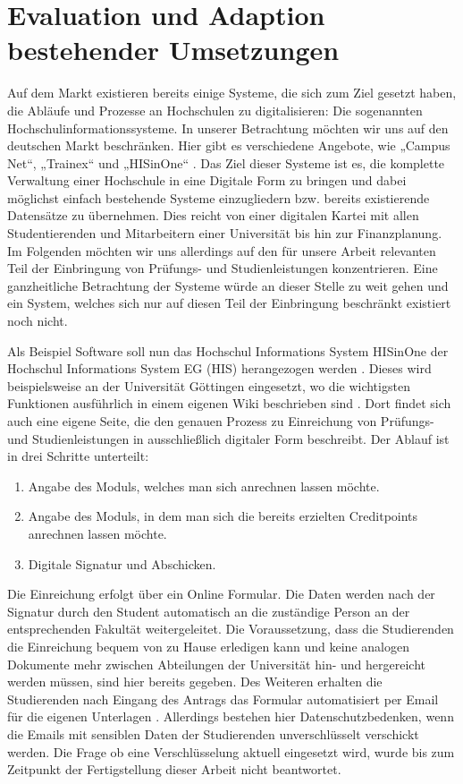 \section{Evaluation und Adaption bestehender Umsetzungen}

Auf dem Markt existieren bereits einige Systeme, die sich zum Ziel gesetzt haben, die Abläufe und Prozesse an Hochschulen zu digitalisieren: Die sogenannten Hochschulinformationssysteme. In unserer Betrachtung möchten wir uns auf den deutschen Markt beschränken. Hier gibt es verschiedene Angebote, wie „Campus Net“, „Trainex“ und „HISinOne“ \parencite{wiki_his}. Das Ziel dieser Systeme ist es, die komplette Verwaltung einer Hochschule in eine Digitale Form zu bringen und dabei möglichst einfach bestehende Systeme einzugliedern bzw. bereits existierende Datensätze zu übernehmen. Dies reicht von einer digitalen Kartei mit allen Studentierenden und Mitarbeitern einer Universität bis hin zur Finanzplanung. Im Folgenden möchten wir uns allerdings auf den für unsere Arbeit relevanten Teil der Einbringung von Prüfungs- und Studienleistungen konzentrieren. Eine ganzheitliche Betrachtung der Systeme würde an dieser Stelle zu weit gehen und ein System, welches sich nur auf diesen Teil der Einbringung beschränkt existiert noch nicht.

Als Beispiel Software soll nun das Hochschul Informations System HISinOne der Hochschul Informations System EG (HIS) herangezogen werden \parencite{hisde}. Dieses wird beispielsweise an der Universität Göttingen eingesetzt, wo die wichtigsten Funktionen ausführlich in einem eigenen Wiki beschrieben sind \parencite{studit}. Dort findet sich auch eine eigene Seite, die den genauen Prozess zu Einreichung von Prüfungs- und Studienleistungen in ausschließlich digitaler Form beschreibt. Der Ablauf ist in drei Schritte unterteilt:
\begin{enumerate}
\item Angabe des Moduls, welches man sich anrechnen lassen möchte.
\item Angabe des Moduls, in dem man sich die bereits erzielten Creditpoints anrechnen lassen möchte.
\item Digitale Signatur und Abschicken.
\end{enumerate}

Die Einreichung erfolgt über ein Online Formular. Die Daten werden nach der Signatur durch den Student automatisch an die zuständige Person an der entsprechenden Fakultät weitergeleitet. Die Voraussetzung, dass die Studierenden die Einreichung bequem von zu Hause erledigen kann und keine analogen Dokumente mehr zwischen Abteilungen der Universität hin- und hergereicht werden müssen, sind hier bereits gegeben. Des Weiteren erhalten die Studierenden nach Eingang des Antrags das Formular automatisiert per Email für die eigenen Unterlagen \parencite{studit_formular}. Allerdings bestehen hier Datenschutzbedenken, wenn die Emails mit sensiblen Daten der Studierenden unverschlüsselt verschickt werden. Die Frage ob eine Verschlüsselung aktuell eingesetzt wird, wurde bis zum Zeitpunkt der Fertigstellung dieser Arbeit nicht beantwortet.

